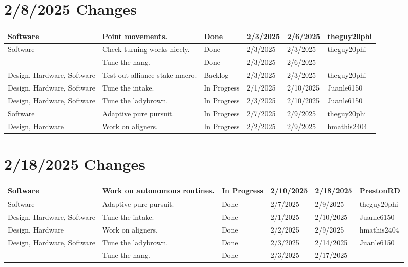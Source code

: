 \section{2/8/2025 Changes}
\begin{center}
\begin{longtable}{| p{40pt} | p{150pt} | p{35pt} | p{33pt} | p{33pt} | p{40pt} |}
\hline \rowcolor{DarkSeaGreen1}
Software & Point movements. & Done & 2/3/2025 & 2/6/2025 & theguy20phi \\
\hline \rowcolor{DarkSeaGreen1}
Software & Check turning works nicely. & Done & 2/3/2025 & 2/3/2025 & theguy20phi \\
\hline \rowcolor{DarkSeaGreen1}
& Tune the hang. & Done & 2/3/2025 & 2/6/2025 & \\
\hline \rowcolor{Ivory2}
Design, Hardware, Software & Test out alliance stake macro. & Backlog & 2/3/2025 & 2/3/2025 & theguy20phi \\
\hline \rowcolor{LightGoldenrod1}
Design, Hardware, Software & Tune the intake. & In Progress & 2/1/2025 & 2/10/2025 & Juanle6150 \\
\hline \rowcolor{LightGoldenrod1}
Design, Hardware, Software & Tune the ladybrown. & In Progress & 2/3/2025 & 2/10/2025 & Juanle6150 \\
\hline \rowcolor{LightGoldenrod1}
Software & Adaptive pure pursuit. & In Progress & 2/7/2025 & 2/9/2025 & theguy20phi \\
\hline \rowcolor{LightGoldenrod1}
Design, Hardware & Work on aligners. & In Progress & 2/2/2025 & 2/9/2025 & hmathis2404 \\
\hline
\end{longtable}
\end{center}


\section{2/18/2025 Changes}
\begin{center}
\begin{longtable}{| p{40pt} | p{150pt} | p{35pt} | p{33pt} | p{33pt} | p{40pt} |}
\hline \rowcolor{LightGoldenrod1}
Software & Work on autonomous routines. & In Progress & 2/10/2025 & 2/18/2025 & PrestonRD \\
\hline \rowcolor{DarkSeaGreen1}
Software & Adaptive pure pursuit. & Done & 2/7/2025 & 2/9/2025 & theguy20phi \\
\hline \rowcolor{DarkSeaGreen1}
Design, Hardware, Software & Tune the intake. & Done & 2/1/2025 & 2/10/2025 & Juanle6150 \\
\hline \rowcolor{DarkSeaGreen1}
Design, Hardware & Work on aligners. & Done & 2/2/2025 & 2/9/2025 & hmathis2404 \\
\hline \rowcolor{DarkSeaGreen1}
Design, Hardware, Software & Tune the ladybrown. & Done & 2/3/2025 & 2/14/2025 & Juanle6150 \\
\hline \rowcolor{DarkSeaGreen1}
& Tune the hang. & Done & 2/3/2025 & 2/17/2025 & \\
\hline
\end{longtable}
\end{center}


